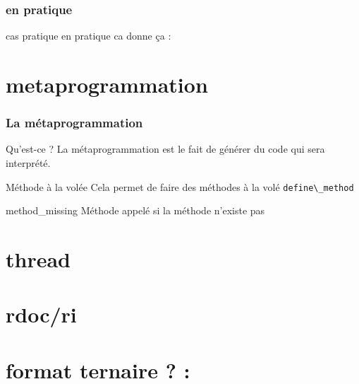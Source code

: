 \documentclass{beamer}
\begin{document}
\begin{frame}
  \frametitle{en pratique}
  \begin{block}{cas pratique}
    en pratique ca donne ça :
  \end{block}
\end{frame}


\section{metaprogrammation}

\begin{frame}
  \frametitle{La m\'etaprogrammation}
  \begin{block}{Qu'est-ce ?}
    La m\'etaprogrammation est le fait de g\'en\'erer du code qui
    sera interpr\'et\'e.
  \end{block}
  \begin{block}{M\'ethode à la vol\'ee}
    Cela permet de faire des m\'ethodes à la vol\'e \verb?define\_method?
  \end{block}
  \begin{block}{method\_missing}
    M\'ethode appel\'e si la m\'ethode n'existe pas
  \end{block}
\end{frame}

\section{thread}
\section{rdoc/ri}
\section{format ternaire ? :}
\end{document}
